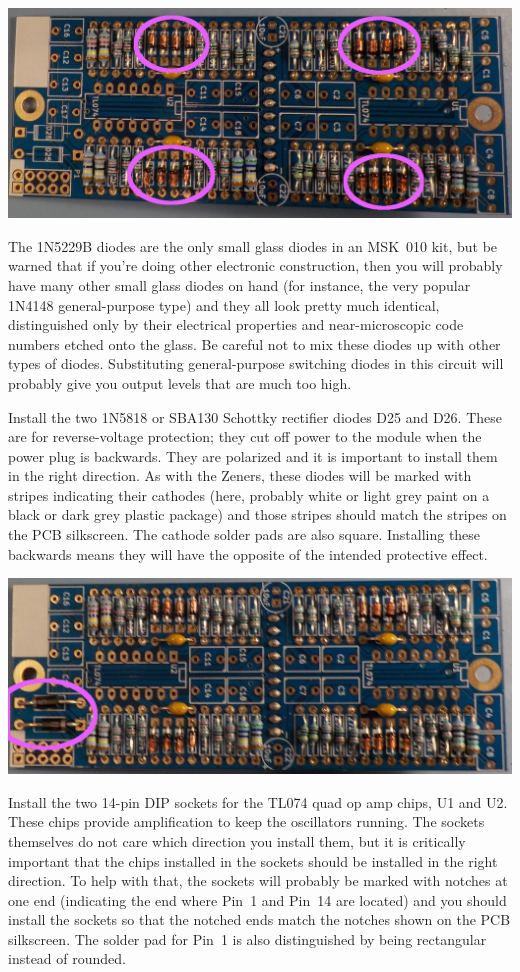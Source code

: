\noindent\includegraphics[width=\linewidth]{zenerB.jpg}

The 1N5229B diodes are the only small glass diodes in an MSK~010 kit, but be
warned that if you're doing other electronic construction, then you will
probably have many other small glass diodes on hand (for instance, the very
popular 1N4148 general-purpose type) and they all look pretty much
identical, distinguished only by their electrical properties and
near-microscopic code numbers etched onto the glass.  Be careful not to mix
these diodes up with other types of diodes.  Substituting general-purpose
switching diodes in this circuit will probably give you output levels that
are much too high.

Install the two 1N5818 or SBA130 Schottky rectifier diodes D25 and D26. 
These are for reverse-voltage protection; they cut off power to the module
when the power plug is backwards.  They are polarized and it is important to
install them in the right direction.  As with the Zeners, these diodes will
be marked with stripes indicating their cathodes (here, probably white or
light grey paint on a black or dark grey plastic package) and those stripes
should match the stripes on the PCB silkscreen.  The cathode solder pads are
also square.  Installing these backwards means they will have the opposite
of the intended protective effect.

\noindent\includegraphics[width=\linewidth]{schottkyB.jpg}

Install the two 14-pin DIP sockets for the TL074 quad op amp chips, U1 and
U2.  These chips provide amplification to keep the oscillators running.  The
sockets themselves do not care which direction you install them, but it is
critically important that the chips installed in the sockets should be
installed in the right direction.  To help with that, the sockets will
probably be marked with notches at one end (indicating the end where Pin~1
and Pin~14 are located) and you should install the sockets so that the
notched ends match the notches shown on the PCB silkscreen.  The solder pad
for Pin~1 is also distinguished by being rectangular instead of rounded.

